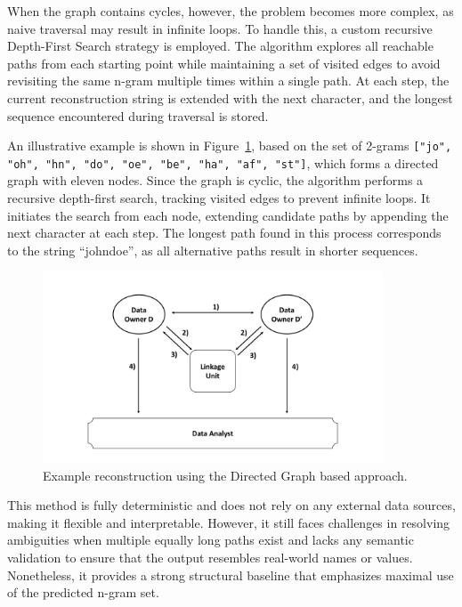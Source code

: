 When the graph contains cycles, however, the problem becomes more complex, as naive traversal may result in infinite loops.
To handle this, a custom recursive Depth-First Search strategy is employed.
The algorithm explores all reachable paths from each starting point while maintaining a set of visited edges to avoid revisiting the same n-gram multiple times within a single path.
At each step, the current reconstruction string is extended with the next character, and the longest sequence encountered during traversal is stored.

An illustrative example is shown in Figure~\ref{fig:graphreconstruction}, based on the set of 2-grams \texttt{["jo", "oh", "hn", "do", "oe", "be", "ha", "af", "st"]}, which forms a directed graph with eleven nodes.
Since the graph is cyclic, the algorithm performs a recursive depth-first search, tracking visited edges to prevent infinite loops.
It initiates the search from each node, extending candidate paths by appending the next character at each step.
The longest path found in this process corresponds to the string \enquote{johndoe}, as all alternative paths result in shorter sequences.

\begin{figure}[H]
\centering
\includegraphics[width=0.9\textwidth, page=18]{img/visualization.pdf}
\caption{Example reconstruction using the Directed Graph based approach.}
\label{fig:graphreconstruction}
\end{figure}

This method is fully deterministic and does not rely on any external data sources, making it flexible and interpretable.
However, it still faces challenges in resolving ambiguities when multiple equally long paths exist and lacks any semantic validation to ensure that the output resembles real-world names or values.
Nonetheless, it provides a strong structural baseline that emphasizes maximal use of the predicted n-gram set.

